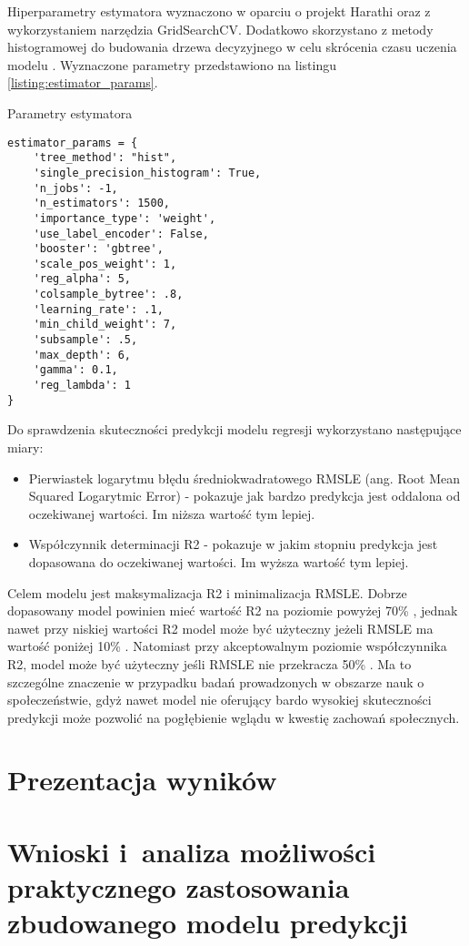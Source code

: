 Hiperparametry estymatora wyznaczono w oparciu o projekt Harathi \cite{harathi-2018} oraz z wykorzystaniem narzędzia GridSearchCV.
Dodatkowo skorzystano z metody histogramowej do budowania drzewa decyzyjnego w celu skrócenia czasu uczenia modelu \cite{golarnyk-2021}.
Wyznaczone parametry przedstawiono na listingu \ref{listing:estimator_params}.

\begin{listing}[h!]
    \caption{Parametry estymatora} \label{listing:estimator_params}
    \begin{verbatim}
estimator_params = {
    'tree_method': "hist",
    'single_precision_histogram': True,
    'n_jobs': -1,
    'n_estimators': 1500,
    'importance_type': 'weight',
    'use_label_encoder': False,
    'booster': 'gbtree',
    'scale_pos_weight': 1,
    'reg_alpha': 5,
    'colsample_bytree': .8,
    'learning_rate': .1,
    'min_child_weight': 7,
    'subsample': .5,
    'max_depth': 6,
    'gamma': 0.1,
    'reg_lambda': 1
}
    \end{verbatim}
    \raggedright\source{\ownwork}
\end{listing}

Do sprawdzenia skuteczności predykcji modelu regresji wykorzystano następujące miary:
\begin{itemize}
    \item Pierwiastek logarytmu błędu średniokwadratowego RMSLE (ang. Root Mean Squared Logarytmic Error) - pokazuje jak bardzo predykcja jest oddalona od oczekiwanej wartości. Im niższa wartość tym lepiej.
    \item Współczynnik determinacji R2  - pokazuje w jakim stopniu predykcja jest dopasowana do oczekiwanej wartości. Im wyższa wartość tym lepiej.
    \end{itemize}

Celem modelu jest maksymalizacja R2 i minimalizacja RMSLE. Dobrze dopasowany model powinien mieć wartość R2 na poziomie powyżej 70\% \cite{r2-good-value}, jednak nawet przy niskiej wartości R2 model może być użyteczny jeżeli RMSLE ma wartość poniżej 10\% \cite{r2-vs-rmse}.
Natomiast przy akceptowalnym poziomie współczynnika R2, model może być użyteczny jeśli RMSLE nie przekracza 50\% \cite{rmse-good-value}.
Ma to szczególne znaczenie w przypadku badań prowadzonych w obszarze nauk o społeczeństwie, gdyż nawet model nie oferujący bardo wysokiej skuteczności predykcji może pozwolić na pogłębienie wglądu w kwestię zachowań społecznych.

\section{Prezentacja wyników}\label{sec:analysis:important-features}
\todo{}
\section{Wnioski i~analiza możliwości praktycznego zastosowania zbudowanego modelu predykcji}\label{sec:analysis:model-fitness}

\thispagestyle{normal}
